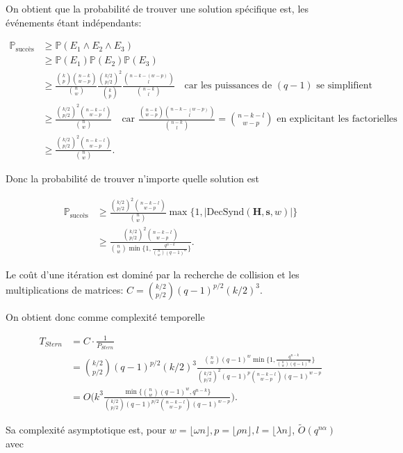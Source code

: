 \documentclass{scrartcl}[a4paper,9pt,headings=small,footinclude=false]
\theoremstyle{definition}
\theoremstyle{remark}
\begin{document}
On obtient que la probabilité de trouver une solution spécifique est, les événements étant indépendants:

\begin{align*}
\mathbb{P}_{\text{succès}} &\geq \mathbb{P}(E_1 \wedge E_2 \wedge E_3)\\
&\geq \mathbb{P}(E_1) \mathbb{P}(E_2) \mathbb{P}(E_3) \\
&\geq \frac{\binom{k}{p}\binom{n-k}{w-p}}{\binom{n}{w}} \frac{\binom{k/2}{p/2}^2}{\binom{k}{p}} \frac{\binom{n-k-(w-p)}{l}}{\binom{n-k}{l}} \quad \text{car les puissances de } (q-1) \text{ se simplifient}\\
&\geq \frac{\binom{k/2}{p/2}^2\binom{n-k-l}{w-p}}{\binom{n}{w}} \quad \text{car } \frac{\binom{n-k}{w-p}\binom{n-k-(w-p)}{l}}{\binom{n-k}{l}} = \binom{n-k-l}{w-p} \text{ en explicitant les factorielles}\\
&\geq \frac{\binom{k/2}{p/2}^2\binom{n-k-l}{w-p}}{\binom{n}{w}}.
\end{align*}

Donc la probabilité de trouver n'importe quelle solution est

\begin{align*}
\mathbb{P}_{\text{succès}} &\geq \frac{\binom{k/2}{p/2}^2\binom{n-k-l}{w-p}}{\binom{n}{w}}\max \{ 1, |\text{DecSynd}(\textbf{H},\textbf{s},w)| \}\\
&\geq \frac{\binom{k/2}{p/2}^2\binom{n-k-l}{w-p}}{\binom{n}{w} \min \{ 1, \frac{q^{n-k}}{\binom{n}{w}(q-1)^w} \}}.
\end{align*}

Le coût d'une itération est dominé par la recherche de collision et les multiplications de matrices: $C=\binom{k/2}{p/2}(q-1)^{p/2}(k/2)^3$.

On obtient donc comme complexité temporelle

\begin{align*}
	T_{Stern} &= C \cdot \frac{1}{P_{Stern}}\\
	&= \binom{k/2}{p/2}(q-1)^{p/2}(k/2)^3 \frac{\binom{n}{w}(q-1)^w \min \{ 1, \frac{q^{n-k}}{\binom{n}{w}(q-1)^w} \} }{\binom{k/2}{p/2}^2 (q-1)^p \binom{n-k-l}{w-p}(q-1)^{w-p}}\\
	&= O\Big(k^3 \frac{\min \{ \binom{n}{w}(q-1)^w, q^{n-k}\} }{\binom{k/2}{p/2} (q-1)^{p/2} \binom{n-k-l}{w-p}(q-1)^{w-p}}\Big).
\end{align*}

Sa complexité asymptotique est, pour $w=\lfloor \omega n \rfloor, p = \lfloor \rho n \rfloor, l= \lfloor \lambda  n \rfloor$, $\tilde{O}(q^{n\alpha})$ avec
\end{document}
